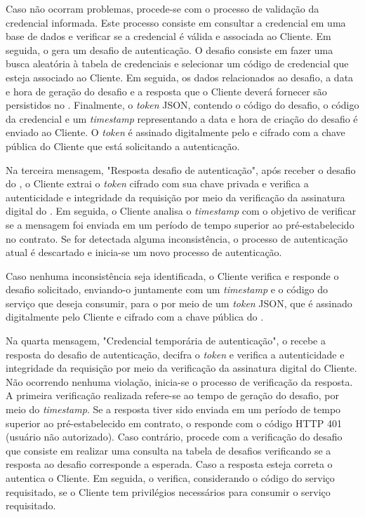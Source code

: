 Caso não ocorram problemas, procede-se com o processo de validação da credencial informada. Este processo consiste em consultar a credencial em uma base de dados e verificar se a credencial é válida e associada ao Cliente. Em seguida, o \servidorAA{} gera um desafio de autenticação. O desafio consiste em fazer uma busca aleatória à tabela de credenciais e selecionar um código de credencial que esteja associado ao Cliente. Em seguida, os dados relacionados ao desafio, a data e hora de geração do desafio e a resposta que o Cliente deverá fornecer são persistidos no \servidorBD. Finalmente, o \emph{token} JSON, contendo o código do desafio, o código da credencial e um \emph{timestamp} representando a data e hora de criação do desafio é enviado ao Cliente. O \emph{token} é assinado digitalmente pelo \servidorAA{} e cifrado com a chave pública do Cliente que está solicitando a autenticação.

Na terceira mensagem, "Resposta desafio de autenticação", após receber o desafio do \servidorAA, o Cliente extrai o \emph{token} cifrado com sua chave privada e verifica a autenticidade e integridade da requisição por meio da verificação da assinatura digital do \servidorAA.
Em seguida, o Cliente analisa o \emph{timestamp} com o objetivo de verificar se a mensagem foi enviada em um período de tempo superior ao pré-estabelecido no contrato. Se for detectada alguma inconsistência, o processo de autenticação atual é descartado e inicia-se um novo processo de autenticação.

Caso nenhuma inconsistência seja identificada, o Cliente verifica e responde o desafio solicitado, enviando-o
juntamente com um \emph{timestamp} e o código do serviço que deseja consumir, para o \servidorAA{} por meio de um \emph{token} JSON, que é assinado digitalmente pelo Cliente e cifrado com a chave pública do \servidorAA.

Na quarta mensagem, "Credencial temporária de autenticação", o \servidorAA{} recebe a resposta do desafio de autenticação, decifra o \emph{token} e verifica a autenticidade e integridade da requisição por meio da verificação da assinatura digital do Cliente. Não ocorrendo nenhuma violação, inicia-se o processo de verificação da resposta. A primeira verificação realizada refere-se ao tempo de geração do desafio, por meio do \emph{timestamp}. Se a resposta tiver sido enviada em um período de tempo superior ao pré-estabelecido em contrato, o \servidorAA{} responde com o código HTTP 401 (usuário não autorizado). Caso contrário, procede com a verificação do desafio que consiste em realizar uma consulta na tabela de desafios verificando se a resposta ao desafio corresponde a esperada. Caso a resposta esteja correta o \servidorAA{}
autentica o Cliente. Em seguida, o \servidorAA{} verifica, considerando o código do serviço requisitado, se o Cliente tem privilégios necessários para consumir o serviço requisitado.

